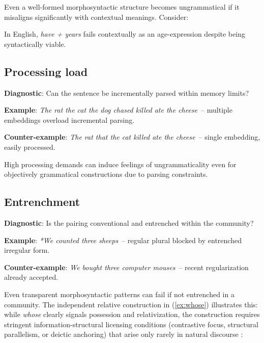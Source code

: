 \documentclass[12pt]{article}
\begin{document}
Even a well-formed morphosyntactic structure becomes ungrammatical if it misaligns significantly with contextual meanings. Consider:

\z
In English, \textit{have + years} fails contextually as an age-expression despite being syntactically viable.

\subsection{Processing load}

\begin{tcolorbox}[colback=lsLightBlue!30]
\textbf{Diagnostic}: Can the sentence be incrementally parsed within memory limits?

\textbf{Example}: \textit{The rat the cat the dog chased killed ate the cheese}~-- multiple embeddings overload incremental parsing.

\textbf{Counter-example}: \textit{The rat that the cat killed ate the cheese}~-- single embedding, easily processed.
\end{tcolorbox}

High processing demands can induce feelings of ungrammaticality even for objectively grammatical constructions due to parsing constraints.

\subsection{Entrenchment}

\begin{tcolorbox}[colback=lsLightBlue!30]
\textbf{Diagnostic}: Is the pairing conventional and entrenched within the community?

\textbf{Example}: \textit{*We counted three sheeps}~-- regular plural blocked by entrenched irregular form.

\textbf{Counter-example}: \textit{We bought three computer mouses}~-- recent regularization already accepted.
\end{tcolorbox}

Even transparent morphosyntactic patterns can fail if not entrenched in a community. The independent relative construction in (\ref{ex:whose}) illustrates this: while \textit{whose} clearly signals possession and relativization, the construction requires stringent information-structural licensing conditions (contrastive focus, structural parallelism, or deictic anchoring) that arise only rarely in natural discourse \autocite{ReynoldsWhose}:
\end{document}
